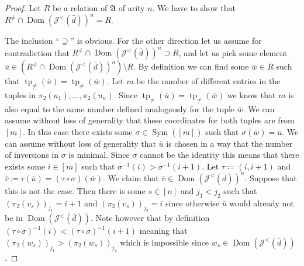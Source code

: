 \documentclass{amsart}
\theoremstyle{definition}
\theoremstyle{remark}
\numberwithin{equation}{section}
\newcommand{\sym}{\operatorname{Sym}}
\newcommand{\dom}{\operatorname{Dom}}
\newcommand{\typ}{\operatorname{tp}}
\newcommand\johnord[1]{\mathcal{J}^{<}(#1)}
\newcommand{\fa}{\mathfrak{A}}
\begin{document}
\begin{proof}
	Let $R$ be a relation of $\fa$ of arity $n$. We have to show that $R^{\neq}\cap \dom(\johnord{\bar{d}})^n=R$.

	The inclusion ``$\supseteq$'' is obvious. For the other direction let us assume for contradiction that $R^{\neq}\cap \dom(\johnord{\bar{d}})^n\supset R$, and let us pick some element $\bar{u}\in (R^{\neq}\cap \dom(\johnord{\bar{d}})^n)\setminus R$. By definition we can find some $\bar{w}\in R$ such that $\typ_{\neq}(\bar{u})=\typ_{\neq}(\bar{w})$. Let $m$ be the number of different entries in the tuples in ${\pi_2}(u_1),\dots,{\pi_2}(u_n)$. Since $\typ_{\neq}(\bar{u})=\typ_{\neq}(\bar{w})$ we know that $m$ is also equal to the same number defined analogously for the tuple $\bar{w}$. We can assume without loss of generality that these coordinates for both tuples are from $[m]$. In this case there exists some $\sigma\in \sym([m])$ such that $\sigma(\bar{w})=\bar{u}$. We can assume without loss of generality that $\bar{u}$ is chosen in a way that the number of inversions in $\sigma$ is minimal. Since $\sigma$ cannot be the identity this means that there exists some $i\in [m]$ such that $\sigma^{-1}(i)>\sigma^{-1}(i+1)$. Let $\tau\coloneqq (i,i+1)$ and $\bar{v}\coloneqq \tau(\bar{u})=(\tau\circ \sigma)(\bar{w})$. We claim that $\bar{v}\in \dom(\johnord{\bar{d}})^n$. Suppose that this is not the case. Then there is some $s\in [n]$ and $j_1<j_2$ such that $(\pi_2(v_s))_{j_1}=i+1$ and $(\pi_2(v_s))_{j_2}=i$ since otherwise $\bar{u}$ would already not be in $\dom(\johnord{\bar{d}})$. Note however that by definition $(\tau\circ \sigma)^{-1}(i)<(\tau\circ \sigma)^{-1}(i+1)$ meaning that $(\pi_2(w_s))_{j_1}{>}(\pi_2(w_s))_{j_2}$ which is impossible since $w_s\in \dom(\johnord{\bar{d}})$. 
	

\end{proof}
\end{document}
